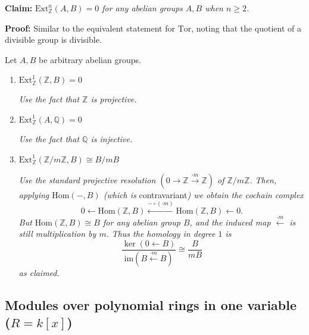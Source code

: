 \documentclass[10pt]{article}
\begin{document}
                \textbf{Claim:} \emph{$\mathrm{Ext}_\mathbb{Z}^n(A,B)=0$ for any
                abelian groups $A,B$ when $n\geqslant2$.}

                \textbf{Proof:} Similar to the equivalent statement for
                $\mathrm{Tor}$, noting that the quotient of a divisible group is
                divisible.

                Let $A,B$ be arbitrary abelian groups.

                \begin{enumerate}
                \def\labelenumi{\arabic{enumi}.}
                \item
                  $\mathrm{Ext}_\mathbb{Z}^1(\mathbb{Z},B)=0$

                  \emph{Use the fact that $\mathbb{Z}$ is projective.}
                \item
                  $\mathrm{Ext}_\mathbb{Z}^1(A,\mathbb{Q})=0$

                  \emph{Use the fact that $\mathbb{Q}$ is injective.}
                \item
                  $\mathrm{Ext}_\mathbb{Z}^1(\mathbb{Z}/m\mathbb{Z},B)\cong B/mB$

                  \emph{Use the standard projective resolution
                  $(0\to\mathbb{Z}\xrightarrow{\cdot m}\mathbb{Z})$ of
                  $\mathbb{Z}/m\mathbb{Z}$.} \emph{Then, applying
                  $\mathrm{Hom}(-,B)$ (which is }contravariant\emph{) we obtain the
                  cochain complex}
                  \[0\leftarrow\mathrm{Hom}(\mathbb{Z},B)\xleftarrow{-\circ(\cdot m)}\mathrm{Hom}(\mathbb{Z},B)\leftarrow0.\]
                  \emph{But $\mathrm{Hom}(\mathbb{Z},B)\cong B$ for any abelian group
                  $B$, and the induced map $\xleftarrow{\cdot m}$ is still
                  multiplication by $m$.} \emph{Thus the homology in degree $1$ is}
                  \[\frac{\ker(0\leftarrow B)}{\mathrm{im}(B\xleftarrow{\cdot m}B)} \cong \frac{B}{mB}\]
                  \emph{as claimed.}
                \end{enumerate}



        \subsection{Modules over polynomial rings in one variable
            ($R=k[x]$)}
\end{document}
